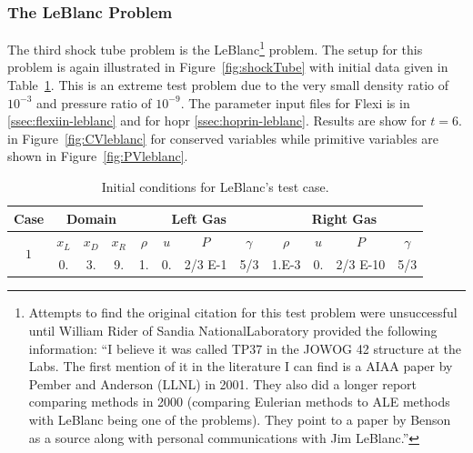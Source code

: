 \subsubsection{The LeBlanc Problem}\label{ss:leblanc}

The third shock tube problem is the LeBlanc\footnote{Attempts to find the original citation for this test problem were unsuccessful until William Rider of Sandia NationalLaboratory provided the following information: ``I believe it was called TP37 in the JOWOG 42 structure at the Labs.  The first mention of it in the literature I can find is a AIAA paper by Pember and Anderson (LLNL) \cite{Pember} in 2001.  They also did a longer report comparing methods in 2000 (comparing Eulerian methods to ALE methods with LeBlanc being one of the problems).  They point to a paper by Benson \cite{Benson} as a source along with personal communications with Jim LeBlanc.''} problem.  The setup for this problem is again illustrated in Figure~\ref{fig:shockTube} with initial data  given in Table~\ref{tab:leblancIC}. This is an extreme test problem due to the very small density ratio of $10^{-3}$ and pressure ratio of $10^{-9}$.  The parameter input files for Flexi is in \ref{ssec:flexiin-leblanc} and for hopr \ref{ssec:hoprin-leblanc}. Results are show for $t = 6.$ in Figure~\ref{fig:CVleblanc} for conserved variables while primitive variables are shown in Figure~\ref{fig:PVleblanc}.

\begin{table}[h!]
 \begin{center}
  \caption{Initial conditions for LeBlanc's test case.}
  \label{tab:leblancIC}
  \begin{tabular}{|c|ccc|cccc|cccc|} \hline
   \textbf{Case} & \multicolumn{3}{c|}{\textbf{Domain}} & \multicolumn{4}{c|}{\textbf{Left Gas}} & \multicolumn{4}{c|}{\textbf{Right Gas}} \\ \hline
   \multirow{2}{*}{$1$} & $x_L$ & $x_D$ & $x_R$ & $\rho$ & $u$ & $P$ & $\gamma$ & $\rho$ & $u$ & $P$ & $\gamma$ \\ \cline{2-12}
   \multicolumn{1}{|c|}{} & 0. & 3. & 9.  & 1. & 0. & 2/3 E-1 & 5/3 & 1.E-3 & 0. & 2/3 E-10 & 5/3 \\ \hline
  \end{tabular}
 \end{center}
\end{table}

